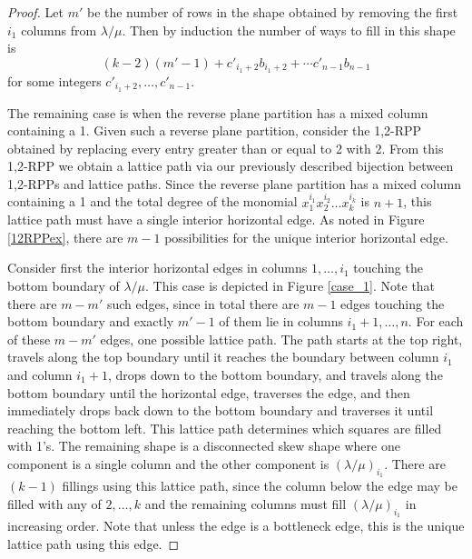 \documentclass[12pt]{amsart}
\theoremstyle{definition}
\begin{document}
\begin{proof}
Let $m'$ be the number of rows in the shape obtained by removing the first $i_1$ columns from $\lambda/\mu$. Then by induction the number of ways to fill in this shape is $$(k-2)(m'-1) + c'_{i_1+2} b_{i_1+2} + \cdots c'_{n-1} b_{n-1}$$ for some integers $c'_{i_1+2},\ldots,c'_{n-1}.$

The remaining case is when the reverse plane partition has a mixed column containing a 1. Given such a reverse plane partition, consider the 1,2-RPP obtained by replacing every entry greater than or equal to 2 with 2. From this 1,2-RPP we obtain a lattice path via our previously described bijection between 1,2-RPPs and lattice paths. Since the reverse plane partition has a mixed column containing a 1 and the total degree of the monomial $x_1^{i_1}x_2^{i_2}\ldots x_k^{i_k}$ is $n+1$, this lattice path must have a single interior horizontal edge. As noted in Figure \ref{12RPPex}, there are $m-1$ possibilities for the unique interior horizontal edge. 

Consider first the interior horizontal edges in columns $1,\ldots,i_1$ touching the bottom boundary of $\lambda/\mu$. This case is depicted in Figure \ref{case_1}. Note that there are $m-m'$ such edges, since in total there are $m-1$ edges touching the bottom boundary and exactly $m'-1$ of them lie in columns $i_1+1,\ldots,n$. For each of these $m-m'$ edges, one possible lattice path. The path starts at the top right, travels along the top boundary until it reaches the boundary between column $i_1$ and column $i_1+1$, drops down to the bottom boundary, and travels along the bottom boundary until the horizontal edge, traverses the edge, and then immediately drops back down to the bottom boundary and traverses it until reaching the bottom left. This lattice path determines which squares are filled with 1's. The remaining shape is a disconnected skew shape where one component is a single column and the other component is $(\lambda/\mu)_{i_1}$. There are $(k-1)$ fillings using this lattice path, since the column below the edge may be filled with any of $2,\ldots,k$ and the remaining columns must fill $(\lambda/\mu)_{i_1}$ in increasing order. Note that unless the edge is a bottleneck edge, this is the unique lattice path using this edge.


\end{proof}
\end{document}
